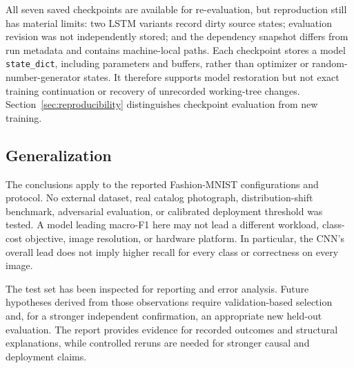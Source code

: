 All seven saved checkpoints are available for re-evaluation, but reproduction still has material limits: two LSTM variants record dirty source states; evaluation revision was not independently stored; and the dependency snapshot differs from run metadata and contains machine-local paths. Each checkpoint stores a model \texttt{state\_dict}, including parameters and buffers, rather than optimizer or random-number-generator states. It therefore supports model restoration but not exact training continuation or recovery of unrecorded working-tree changes. Section~\ref{sec:reproducibility} distinguishes checkpoint evaluation from new training.

\subsection{Generalization}

The conclusions apply to the reported Fashion-MNIST configurations and protocol. No external dataset, real catalog photograph, distribution-shift benchmark, adversarial evaluation, or calibrated deployment threshold was tested. A model leading macro-F1 here may not lead a different workload, class-cost objective, image resolution, or hardware platform. In particular, the CNN's overall lead does not imply higher recall for every class or correctness on every image.

The test set has been inspected for reporting and error analysis. Future hypotheses derived from those observations require validation-based selection and, for a stronger independent confirmation, an appropriate new held-out evaluation. The report provides evidence for recorded outcomes and structural explanations, while controlled reruns are needed for stronger causal and deployment claims.
